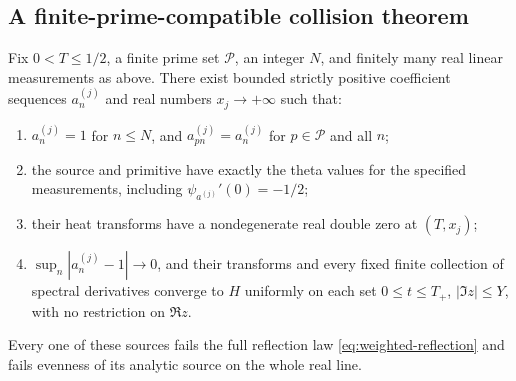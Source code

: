 \subsection{A finite-prime-compatible collision theorem}

\begin{theorem}\label{thm:controls}
Fix $0<T\le1/2$, a finite prime set $\mathcal P$, an integer $N$, and
finitely many real linear measurements as above. There exist bounded
strictly positive coefficient sequences $a_n^{(j)}$ and real numbers
$x_j\to+\infty$ such that:
\begin{enumerate}
\item $a_n^{(j)}=1$ for $n\le N$, and
      $a_{pn}^{(j)}=a_n^{(j)}$ for $p\in\mathcal P$ and all $n$;
\item the source and primitive have exactly the theta values for the
      specified measurements, including $\psi_{a^{(j)}}'(0)=-1/2$;
\item their heat transforms have a nondegenerate real double zero at
      $(T,x_j)$;
\item $\sup_n|a_n^{(j)}-1|\to0$, and their transforms and every fixed finite
      collection of spectral derivatives converge to $H$ uniformly on
      each set $0\le t\le T_+$, $|\Im z|\le Y$, with no restriction on
      $\Re z$.
\end{enumerate}
Every one of these sources fails the full reflection law
\eqref{eq:weighted-reflection} and fails evenness of its analytic source
on the whole real line.
\end{theorem}
